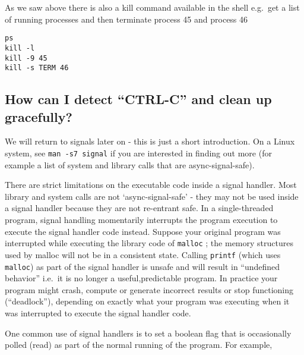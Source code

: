 As we saw above there is also a kill command available in the shell
e.g.~get a list of running processes and then terminate process 45 and
process 46

\begin{verbatim}
ps
kill -l 
kill -9 45
kill -s TERM 46
\end{verbatim}

\subsection{\texorpdfstring{How can I detect ``CTRL-C'' and clean up
gracefully?}{How can I detect CTRL-C and clean up gracefully?}}\label{how-can-i-detect-ctrl-c-and-clean-up-gracefully}

We will return to signals later on - this is just a short introduction.
On a Linux system, see \texttt{man\ -s7\ signal} if you are interested
in finding out more (for example a list of system and library calls that
are async-signal-safe).

There are strict limitations on the executable code inside a signal
handler. Most library and system calls are not `async-signal-safe' -
they may not be used inside a signal handler because they are not
re-entrant safe. In a single-threaded program, signal handling
momentarily interrupts the program execution to execute the signal
handler code instead. Suppose your original program was interrupted
while executing the library code of \texttt{malloc} ; the memory
structures used by malloc will not be in a consistent state. Calling
\texttt{printf} (which uses \texttt{malloc}) as part of the signal
handler is unsafe and will result in ``undefined behavior'' i.e.~it is
no longer a useful,predictable program. In practice your program might
crash, compute or generate incorrect results or stop functioning
(``deadlock''), depending on exactly what your program was executing
when it was interrupted to execute the signal handler code.

One common use of signal handlers is to set a boolean flag that is
occasionally polled (read) as part of the normal running of the program.
For example,

\begin{Shaded}
\begin{Highlighting}[]
 

  
  \NormalTok{;}
\NormalTok{\}}

 
  \NormalTok{;}
   
   \NormalTok{\}}
\NormalTok{\}}
\end{Highlighting}
\end{Shaded}

